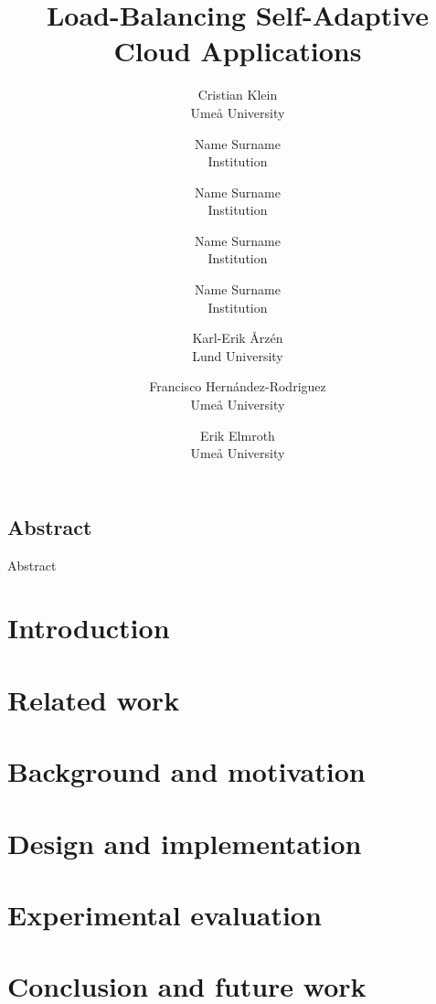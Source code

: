 \documentclass[letterpaper,twocolumn,10pt]{article}
\begin{document}
\date{}
\title{\Large \bf Load-Balancing Self-Adaptive Cloud Applications}

\author{
{\rm Cristian Klein}\\
Ume{\aa} University
\and
{\rm Name Surname}\\
Institution
\and
{\rm Name Surname}\\
Institution
\and
{\rm Name Surname}\\
Institution
\and
{\rm Name Surname}\\
Institution
\and
{\rm Karl-Erik {\AA}rz\'en}\\
Lund University
\and
{\rm Francisco Hern{\'a}ndez-Rodriguez}\\
Ume{\aa} University
\and
{\rm Erik Elmroth}\\
Ume{\aa} University
} %

\maketitle



\subsection*{Abstract}
Abstract

\section{Introduction}
\label{sec:Introduction}


\section{Related work}
\label{sec:Related}


\section{Background and motivation}
\label{sec:ProblemStatement}


\section{Design and implementation}
\label{sec:Solution}


\section{Experimental evaluation}
\label{sec:Results}


\section{Conclusion and future work}
\label{sec:Conclusion}


\printbibliography
\end{document}
